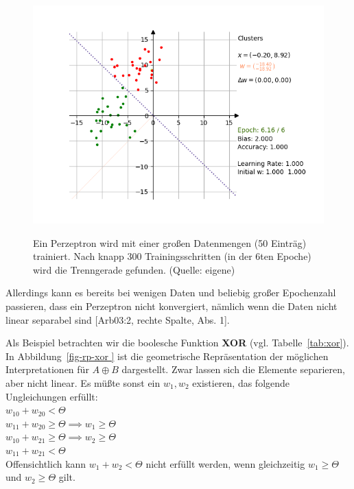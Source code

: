 \begin{figure}[h]
    \centering
    \includegraphics{images/rosenblatt/blob_success.png}
    \caption{}
    \label{fig-rp-blobs}
    \small Ein Perzeptron wird mit einer großen Datenmengen (50 Einträg) trainiert. Nach knapp 300 Trainingsschritten (in der 6ten Epoche) wird die Trenngerade gefunden. (Quelle: eigene)
\end{figure}

\noindent
Allerdings kann es bereits bei wenigen Daten und beliebig großer Epochenzahl passieren, dass ein Perzeptron nicht konvergiert, nämlich wenn die Daten nicht linear separabel sind [Arb03:2, rechte Spalte, Abs. 1].

Als Beispiel betrachten wir die boolesche Funktion \textbf{XOR} (vgl. Tabelle~\ref{tab:xor}). In Abbildung~\ref{fig-rp-xor } ist die geometrische Repräsentation der möglichen Interpretationen für $A \oplus B$ dargestellt.
Zwar lassen sich die Elemente separieren, aber nicht linear.
Es müßte sonst ein $w_1, w_2$ existieren, das folgende Ungleichungen erfüllt:\\


$w_10 + w_20 < \Theta$\\

$w_11 + w_20 \geq \Theta \implies w_1 \geq \Theta$\\

$w_10 + w_21 \geq \Theta \implies w_2 \geq \Theta$\\

$w_11 + w_21 < \Theta$\\

\noindent
Offensichtlich kann $w_1 + w_2 < \Theta$ nicht erfüllt werden, wenn gleichzeitig $w_1 \geq \Theta$ und $w_2 \geq \Theta$ gilt.

